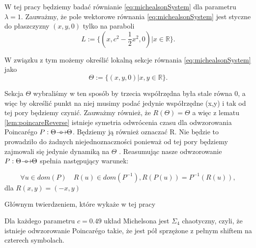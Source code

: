 W tej pracy będziemy badać równianie \eqref{eq:michealsonSystem} dla parametru $ \lambda = 1$.
Zauważmy, że pole wektorowe równania \eqref{eq:michealsonSystem} jest styczne do płaszczyzny $(x,y,0) $
tylko na paraboli 
$$
      L := \{ (x,c^2 - \frac{1}{2} x^2,0) | x \in \mathbb R\}.
$$

W związku z tym możemy określić lokalną sekcje równania \eqref{eq:michealsonSystem} jako 
$$
  \Theta := \{(x,y,0) | x,y \in \mathbb R \} .
$$

Sekcja $ \Theta $ wybraliśmy w ten sposób by trzecia współrzędna była stale równa 0, 
a więc by określić punkt na niej musimy podać jedynie współrzędne (x,y) i tak od tej pory będziemy czynić.
Zauważmy również, że $ R(\Theta) = \Theta $ a więc z lematu \eqref{lem:poincareReverse} istnieje symetria odwrócenia czasu 
dla odwzorowania Poincar\'ego
$ P : \Theta {\mathrel{\longrightarrow\mkern-25mu\circ}\;\;} \Theta $. Będziemy ją również oznaczać R. Nie będzie to prowadziło do żadnych niejednoznaczności 
ponieważ od tej pory będziemy
zajmowali się jedynie dynamiką na $ \Theta$ .
Reasumując nasze odwzorowanie $ P : \Theta {\mathrel{\longrightarrow\mkern-25mu\circ}\;\;} \Theta $ spełnia następujący warunek:

\begin{equation}
  \forall u \in dom(P) \quad R(u) \in dom(P^{-1}) , R(P(u)) = P^{-1}(R(u)),
\end{equation}
dla $ R(x,y) = (-x,y) $ 

Głównym twierdzeniem, które wykaże w tej pracy 
\begin{theorem}
  Dla każdego parametru $ c = 0.49 $ układ Michelsona jest $ \Sigma_4 $ chaotyczny,
  czyli, że istnieje odwzorowanie Poincar\'ego takie, że jest pół sprzężone z pełnym shiftem na czterech symbolach.
\end{theorem}

